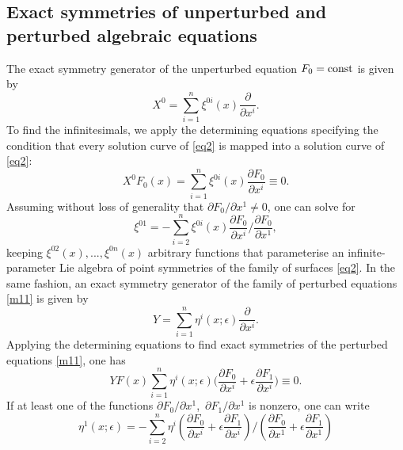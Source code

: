 \documentclass[11pt,letter,subeqn]{article}
\def\const{\hbox{\rm const}}
\begin{document}
\subsection{Exact symmetries of unperturbed and perturbed algebraic equations}\label{sec:plate:localCLs:pot}
The exact symmetry generator of the unperturbed equation $F_0=\const$ is given by
\begin{equation}\label{m12}
  X^0=\sum_{i=1}^{n}\xi^{0i}(x)\dfrac{\partial}{\partial x^i}.
\end{equation}
To find the infinitesimals, we apply the determining equations specifying the condition that every solution curve of \eqref{eq2} is mapped into a solution curve of \eqref{eq2}:
\begin{equation}\label{oo}
   X^0F_0(x)=\sum_{i=1}^{n}\xi^{0i}(x)\dfrac{\partial F_0}{\partial x^i}\equiv 0.
\end{equation}
Assuming without loss of generality that ${\partial F_0}\big/{\partial x^1}\neq 0$, one can solve for
\begin{equation}\label{eq10}
\xi^{01}={-\sum_{i=2}^{n}\xi^{0i}(x)\dfrac{\partial F_0}{\partial x^i}}\bigg/{\dfrac{\partial F_0}{\partial x^1}},
\end{equation}
keeping $\xi^{02}(x),...,\xi^{0n}(x)$ arbitrary functions that parameterise an infinite-parameter Lie algebra of point symmetries of the family of surfaces \eqref{eq2}.  In the same fashion, an exact symmetry generator of the family of perturbed equations \eqref{m11} is given by
\begin{equation}\label{m1444}
  Y=\sum_{i=1}^{n}\eta^{i}(x;\epsilon)\dfrac{\partial}{\partial x^i}.
\end{equation}
Applying the determining equations to find exact symmetries of the perturbed equations \eqref{m11}, one has
\begin{equation}\label{m103}
  YF(x) \sum_{i=1}^{n}\eta^{i}(x;\epsilon)\bigg(\dfrac{\partial F_0}{\partial x^i}+\epsilon \dfrac{\partial F_1}{\partial x^i}\bigg) \equiv 0.
\end{equation}
If at least one of the functions ${\partial F_0}\big/{\partial x^1}$,\, ${\partial F_1}\big/{\partial x^1}$ is nonzero, one can write
\begin{equation}\label{eq12}
  \eta^1(x;\epsilon)={-\sum_{i=2}^{n}\eta^{i}\left(\dfrac{\partial F_0}{\partial x^i}+\epsilon \dfrac{\partial F_1}{\partial x^i}\right) }\bigg/\left({\dfrac{\partial
  F_0}{\partial x^1}}+\epsilon\dfrac{\partial F_1}{\partial x^1}\right)
\end{equation}
\end{document}
